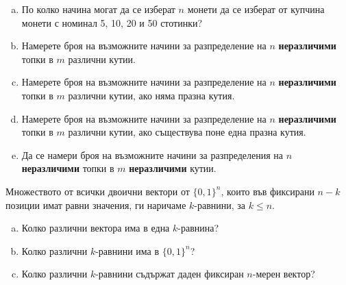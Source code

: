 \begin{problem}
  \begin{enumerate}[a)]
  \item
    По колко начина могат да се изберат $n$ монети да се изберат от купчина монети с номинал 5, 10, 20 и 50 стотинки?
  \item
    Намерете броя на възможните начини за разпределение на $n$ {\bf неразличими} топки в $m$ различни кутии.
  \item
    Намерете броя на възможните начини за разпределение на $n$ {\bf неразличими} топки в $m$ различни кутии, 
    ако няма празна кутия.
  \item
    Намерете броя на възможните начини за разпределение на $n$ {\bf неразличими} топки в $m$ различни кутии,
    ако съществува поне една празна кутия.
  \item
    Да се намери броя на възможните начини за разпределения на $n$ {\bf неразличими} топки в $m$ {\bf неразличими} кутии.
  \end{enumerate}
\end{problem}

\begin{problem}
  Множеството от всички двоични вектори от $\{0,1\}^{n}$, които във фиксирани $n-k$ позиции имат равни значения,
  ги наричаме $k$-равнини, за $k\leq n$.
  \begin{enumerate}[a)]
  \item
    Колко различни вектора има в една $k$-равнина?
  \item
    Колко различни $k$-равнини има в $\{0,1\}^{n}$?
  \item
    Колко различни $k$-равнини съдържат даден фиксиран $n$-мерен вектор?
  \end{enumerate}
\end{problem}


